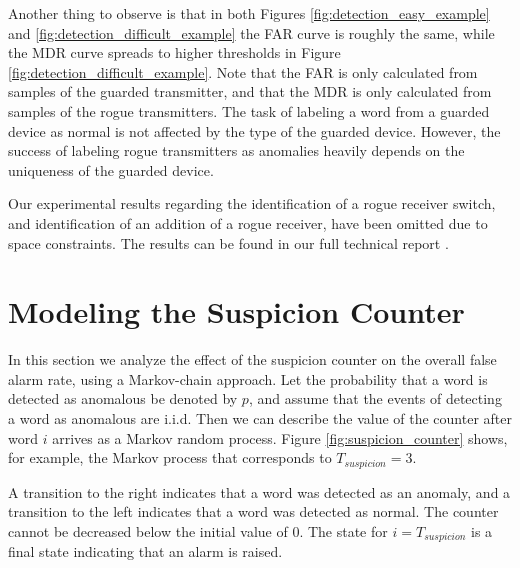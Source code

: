 \documentclass[english]{llncs}
\newcommand{\level}[1]{\section{#1}}
\newcommand{\level}[1]{\chapter{#1}}
\begin{document}
  Another thing to observe is that in both Figures \ref{fig:detection_easy_example} and \ref{fig:detection_difficult_example} the FAR curve is roughly the same, while the MDR curve spreads to higher thresholds in Figure \ref{fig:detection_difficult_example}. Note that the FAR is only calculated from samples of the guarded transmitter, and that the MDR is only calculated from samples of the rogue transmitters. The task of labeling a word from a guarded device as normal is not affected by the type of the guarded device. However, the success of
  labeling rogue transmitters as anomalies heavily depends on the uniqueness of the guarded device.
  
  Our experimental results regarding the identification of a rogue receiver switch, and identification of an addition of a rogue receiver, have been omitted due to space constraints. The results can be found in our full technical report \cite{gilboa-markevich2020hardware}.

\vspace*{-1ex}    
\level{Modeling the Suspicion Counter} \label{ModelingSuspicionCounter}
  In this section we analyze the effect of the suspicion counter on the overall false alarm rate, using a Markov-chain approach. Let the probability that a word is detected as anomalous be denoted by $p$, and assume that the events of detecting a word as anomalous are i.i.d. 
  Then we can describe the value of the counter after word $i$ arrives as a Markov random process. 
  Figure \ref{fig:suspicion_counter} shows, for example, the Markov process that corresponds to $T_{suspicion} = 3$.
  
  A transition to the right indicates that a word was detected as an anomaly, and a transition to the left indicates that a word was detected as normal. 
  The counter cannot be decreased below the initial value of 0. The state for $i = T_{suspicion}$ is a final state indicating that an alarm is raised.
  
\end{document}
